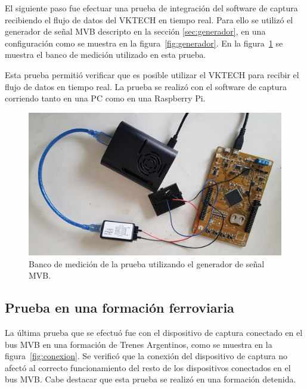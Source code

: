 
El siguiente paso fue efectuar una prueba de integración del software de captura recibiendo el flujo de datos del VKTECH en tiempo real.
Para ello se utilizó el generador de señal MVB descripto en la sección \ref{sec:generador}, en una configuración como se muestra en la figura~\ref{fig:generador}.
En la figura~\ref{fig:educiaa+vktech} se muestra el banco de medición utilizado en esta prueba.

Esta prueba permitió verificar que es posible utilizar el VKTECH para recibir el flujo de datos en tiempo real.
La prueba se realizó con el software de captura corriendo tanto en una PC como en una Raspberry Pi.

\begin{figure}[htbp]
	\centering
	\includegraphics[width=\textwidth]{./Figures/educiaa+vktech.jpg}
	\caption{Banco de medición de la prueba utilizando el generador de señal MVB.}
    \label{fig:educiaa+vktech}
\end{figure}


\subsection{Prueba en una formación ferroviaria}



La última prueba que se efectuó fue con el dispositivo de captura conectado en el bus MVB en una formación de Trenes Argentinos, como se muestra en la figura~\ref{fig:conexion}.
Se verificó que la conexión del dispositivo de captura no afectó al correcto funcionamiento del resto de los dispositivos conectados en el bus MVB. Cabe destacar que esta prueba se realizó en una formación detenida.

